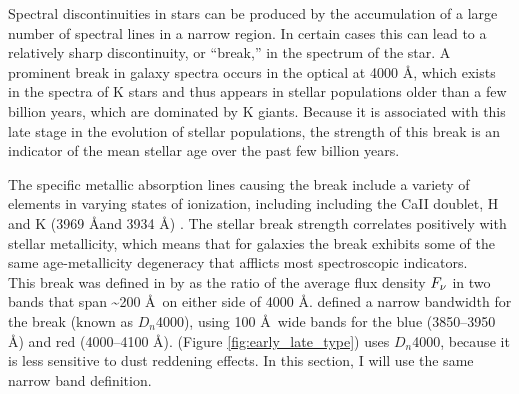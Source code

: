 Spectral discontinuities in stars can be 
produced by the accumulation of a large number 
of spectral lines in a narrow region. 
In certain cases this can lead to a relatively 
sharp discontinuity, or ``break,'' in  the 
spectrum of the star.  
A prominent break in galaxy spectra occurs in the
optical at 4000 
\AA \citep{bruzual1981, bruzual_a._spectral_1983}, 
which exists in the spectra of K stars and thus 
appears in stellar populations older than a few
billion years, which are dominated
by K giants. Because it is associated with this 
late stage in the evolution of stellar populations,
the strength of this break is an indicator of the 
mean stellar age over the past few billion years.

The specific metallic absorption lines causing the break 
include a variety of elements in varying states of 
ionization, including including the CaII doublet, H 
and K (3969 \AA and 3934 \AA)
\citep{hamilton1985}. The stellar break strength
correlates positively with stellar metallicity, which
means that for galaxies the break exhibits some of the 
same age-metallicity degeneracy that afflicts most spectroscopic indicators.\\ 



This break was defined in by \citet{bruzual_a._spectral_1983-2} as the 
ratio of the average flux density $F_{\rm \nu}$ in two bands that span 
\textasciitilde200 \AA\ on either side of 4000 \AA. 
\citet{1999ApJ...527...54B} defined a narrow bandwidth for
the break (known as $D_n$4000), using 100 \AA\ wide bands for
the blue (3850--3950 \AA) and red (4000--4100 \AA).
\citet{kauffmann_stellar_2003} 
(Figure \ref{fig:early_late_type}) uses $D_n$4000, because
it is less sensitive to dust reddening effects. In this 
section, I will use the same narrow band definition.\\


